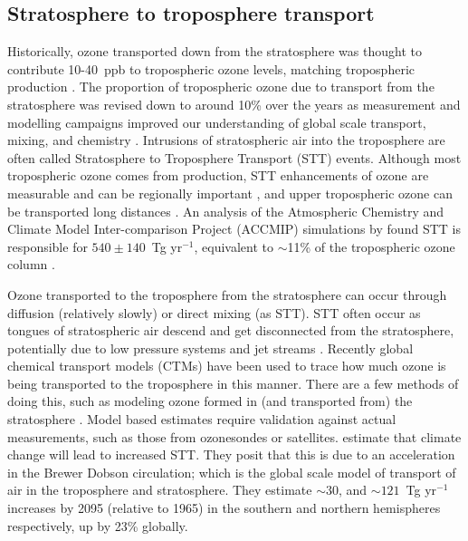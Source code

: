   \subsection{Stratosphere to troposphere transport}
    \label{LR:O3:STT}
    Historically, ozone transported down from the stratosphere was thought to contribute 10-40~ppb to tropospheric ozone levels, matching tropospheric production \parencite{Atkinson2000, Stohl2003}.
    The proportion of tropospheric ozone due to transport from the stratosphere was revised down to around 10\% over the years as measurement and modelling campaigns improved our understanding of global scale transport, mixing, and chemistry \parencite{Guenther2006,Monks2015}.
    Intrusions of stratospheric air into the troposphere are often called Stratosphere to Troposphere Transport (STT) events.
    Although most tropospheric ozone comes from production, STT enhancements of ozone are measurable and can be regionally important \parencite[eg.][]{Jacobson2000,Lelieveld2009,Kuang2017}, and upper tropospheric ozone can be transported long distances \parencite{Cooper2004}.
    An analysis of the Atmospheric Chemistry and Climate Model Inter-comparison Project (ACCMIP) simulations by \textcite{Young2013} found STT is responsible for $540\pm140$~Tg yr$^{-1}$, equivalent to $\sim$11\% of the tropospheric ozone column \parencite{Monks2015}.
    
    
    Ozone transported to the troposphere from the stratosphere can occur through diffusion (relatively slowly) or direct mixing (as STT).
    STT often occur as tongues of stratospheric air descend and get disconnected from the stratosphere, potentially due to low pressure systems and jet streams \parencite{Sprenger2003}.
    Recently global chemical transport models (CTMs) have been used to trace how much ozone is being transported to the troposphere in this manner.
    There are a few methods of doing this, such as modeling ozone formed in (and transported from) the stratosphere \parencite{Ojha2016}.
    Model based estimates require validation against actual measurements, such as those from ozonesondes or satellites.
    \textcite{Hegglin2009} estimate that climate change will lead to increased STT.
    They posit that this is due to an acceleration in the Brewer Dobson circulation; which is the global scale model of transport of air in the troposphere and stratosphere.
    They estimate $\sim 30$, and $\sim 121$~Tg yr$^{-1}$ increases by 2095 (relative to 1965) in the southern and northern hemispheres respectively, up by 23\% globally.
    
